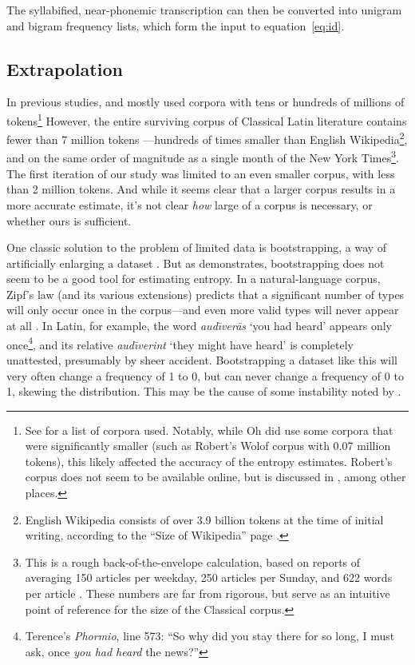 \documentclass[12pt,twoside]{article}
\begin{document}
The syllabified, near-phonemic transcription can then be converted into unigram and bigram frequency lists, which form the input to equation~\ref{eq:id}.

\subsection{Extrapolation}
\label{subsec:extrapolate}

In previous studies, \citet{coupé} and \citet{oh} mostly used corpora with tens or hundreds of millions of tokens\footnote{See \cite[30-31]{oh} for a list of corpora used. Notably, while Oh did use some corpora that were significantly smaller (such as Robert's Wolof corpus with 0.07 million tokens), this likely affected the accuracy of the entropy estimates. Robert's corpus does not seem to be available online, but is discussed in \citet{robert}, among other places.} However, the entire surviving corpus of Classical Latin literature contains fewer than 7 million tokens \citep{phi}---hundreds of times smaller than English Wikipedia\footnote{English Wikipedia consists of over 3.9 billion tokens at the time of initial writing, according to the ``Size of Wikipedia'' page \citep{wiki}.}, and on the same order of magnitude as a single month of the New York Times\footnote{This is a rough back-of-the-envelope calculation, based on reports of averaging 150 articles per weekday, 250 articles per Sunday, and 622 words per article \citep{meyer,menendez}. These numbers are far from rigorous, but serve as an intuitive point of reference for the size of the Classical corpus.}. The first iteration of our study was limited to an even smaller corpus, with less than 2 million tokens. And while it seems clear that a larger corpus results in a more accurate estimate, it's not clear \emph{how} large of a corpus is necessary, or whether ours is sufficient.

One classic solution to the problem of limited data is bootstrapping, a way of artificially enlarging a dataset \citep{oh,efron}. But as \citet[55-56]{oh} demonstrates, bootstrapping does not seem to be a good tool for estimating entropy. In a natural-language corpus, Zipf's law (and its various extensions) predicts that a significant number of types will only occur once in the corpus---and even more valid types will never appear at all \citep{davis}. In Latin, for example, the word \emph{aud\=\i{}ver\=as} `you had heard' appears only once\footnote{Terence's \emph{Phormio}, line 573: ``So why did you stay there for so long, I must ask, once \emph{you had heard} the news?''}, and its relative \emph{aud\=\i{}verint} `they might have heard' is completely unattested, presumably by sheer accident. Bootstrapping a dataset like this will very often change a frequency of 1 to 0, but can never change a frequency of 0 to 1, skewing the distribution. This may be the cause of some instability noted by \citet[56]{oh}.
\end{document}
